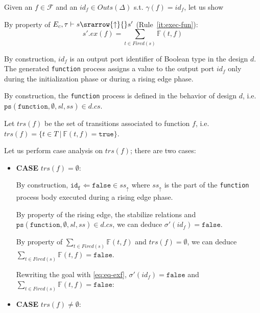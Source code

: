 \documentclass[dvipsnames,12pt]{article}
\begin{document}
\begin{niproof}
  Given an $f\in\mathcal{F}$ and an $id_f\in{}Outs(\Delta)$
  s.t. $\gamma(f)=id_f$, let us show 

  By property of
  $E_c,\tau\vdash{}s\srarrow{\uparrow}{\fontsize{7}{7}\selectfont}s'$
  (Rule~\ref{it:exec-fun}):
  \begin{equation}
    s'.ex(f)=\sum\limits_{t\in{}Fired(s)}\mathbb{F}(t,f)\label{eq:eq-exf}
  \end{equation}

  By construction, $id_f$ is an output port identifier of Boolean type
  in the \hvhdl{} design $d$. The generated \texttt{function} process
  assigns a value to the output port $id_f$ only during the
  initialization phase or during a rising edge phase.
  
  By construction, the \texttt{function} process is defined in the
  behavior of design $d$, i.e.\\
  $\mathtt{ps}(\texttt{function}, \emptyset, sl, ss)\in{}d.cs$.
  
  Let $trs(f)$ be the set of transitions associated to function $f$,
  i.e. $trs(f)=\{t\in{}T~\vert~\mathbb{F}(t,f)=\mathtt{true}\}$.

  Let us perform case analysis on $trs(f)$; there are two cases:
  
  \begin{itemize}
  \item \textbf{CASE} $trs(f)=\emptyset$:
    
    By construction,
    $\mathtt{id_f\Leftarrow{}false}\in{}ss_{\uparrow}$ where
    $ss_\uparrow$ is the part of the \texttt{function} process body
    executed during a rising edge phase.

    By property of the \hvhdl{} rising edge, the stabilize relations
    and $\mathtt{ps}(\texttt{function}, \emptyset, sl, ss)\in{}d.cs$, we can
    deduce $\sigma'(id_f)=\mathtt{false}$.
    
    \noindent{}By property of
    $\sum\limits_{t\in{}Fired(s)}\mathbb{F}(t,f)$ and
    $trs(f)=\emptyset$, we can deduce
    $\sum\limits_{t\in{}Fired(s)}\mathbb{F}(t,f)=\mathtt{false}$.

    \noindent{}Rewriting the goal with \eqref{eq:eq-exf},
    $\sigma'(id_f)=\mathtt{false}$ and
    $\sum\limits_{t\in{}Fired(s)}\mathbb{F}(t,f)=\mathtt{false}$:
    
  \item \textbf{CASE} $trs(f)\neq\emptyset$:
    

\end{itemize}
\end{niproof}
\end{document}
